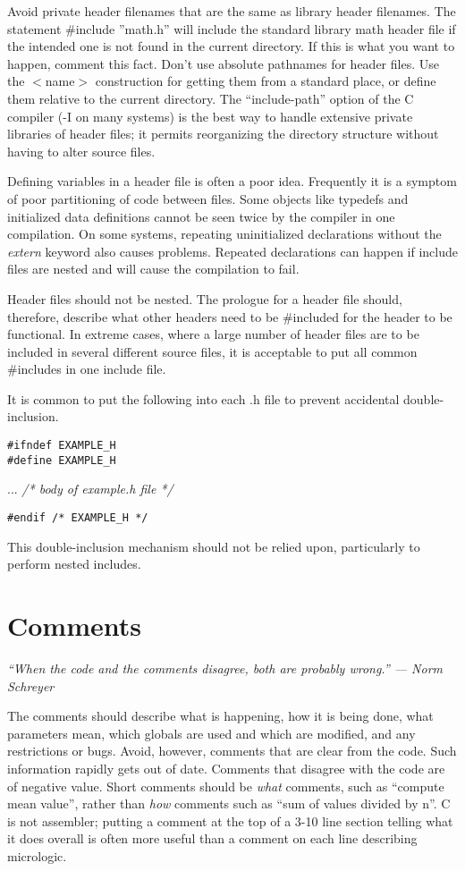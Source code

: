  Avoid private header filenames that are the same as library header filenames.
The statement \#include ''math.h'' will include the standard library math
header file if the intended one is not found in the current directory. If this
is what you want to happen, comment this fact. Don't use absolute pathnames for
header files. Use the $<$name$>$ construction for getting them from a standard
place, or define them relative to the current directory. The ``include-path''
option of the C compiler (-I on many systems) is the best way to handle
extensive private libraries of header files; it permits reorganizing the
directory structure without having to alter source files. 

 Defining variables in a header file is often a poor idea. Frequently it is a
symptom of poor partitioning of code between files. Some objects like typedefs
and initialized data definitions cannot be seen twice by the compiler in one
compilation. On some systems, repeating uninitialized declarations without
the {\em extern} keyword also causes problems. Repeated declarations can happen
if include files are nested and will cause the compilation to fail. 

 Header files should not be nested. The prologue for a header file should,
therefore, describe what other headers need to be \#included for the header to
be functional. In extreme cases, where a large number of header files are to be
included in several different source files, it is acceptable to put all common
\#includes in one include file. 

 It is common to put the following into each .h file to prevent accidental
double-inclusion. 
\begin{verbatim}
#ifndef EXAMPLE_H
#define EXAMPLE_H
\end{verbatim}
  ... {\em /* body of example.h file */}
\begin{verbatim}
#endif /* EXAMPLE_H */ 
\end{verbatim}

This double-inclusion mechanism should not be relied upon, particularly to
perform nested includes. 
\newpage
\section{Comments}

{\em ``When the code and the comments disagree, both are probably wrong.'' ---
Norm Schreyer}

 The comments should describe what is happening, how it is being done, what
parameters mean, which globals are used and which are modified, and any
restrictions or bugs. Avoid, however, comments that are clear from the code.
Such information rapidly gets out of date. Comments that disagree with the code
are of negative value. Short comments should be {\em what} comments, such as
``compute mean value'', rather than {\em how} comments such as ``sum of values
divided by n''. C is not assembler; putting a comment at the top of a 3-10 line
section telling what it does overall is often more useful than a comment on
each line describing micrologic. 

